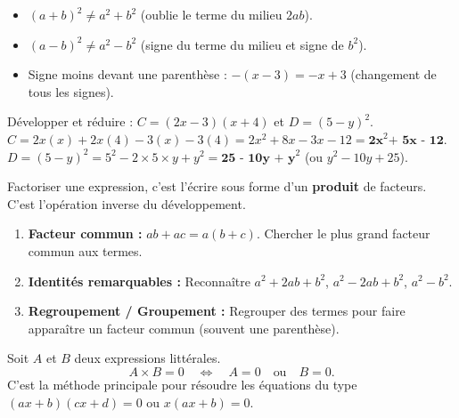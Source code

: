 \documentclass[11pt]{article}
\newcounter{popsec}
\newcounter{popsub}
\newcommand{\courssub}[1]{%
  \stepcounter{popsub}%
  \par\vspace{9pt}\noindent{\popxbold\fontsize{11.5}{13}\selectfont\color{popink}{\color{poporange}\thepopsec.\thepopsub}\hspace{6pt}#1}\par\nopagebreak\vspace{4pt}
}
\begin{document}
\begin{attention}
\begin{itemize}
    \item $(a + b)^2 \neq a^2 + b^2$ (oublie le terme du milieu $2ab$).
    \item $(a - b)^2 \neq a^2 - b^2$ (signe du terme du milieu et signe de $b^2$).
    \item Signe moins devant une parenthèse : $-(x - 3) = -x + 3$ (changement de tous les signes).
\end{itemize}
\end{attention}

\begin{exoresolu}
Développer et réduire : $C = (2x - 3)(x + 4)$ et $D = (5 - y)^2$.
\tcblower
$C = 2x(x) + 2x(4) - 3(x) - 3(4) = 2x^2 + 8x - 3x - 12 = \textbf{2x}^2 \textbf{+ 5x - 12}$.\\
$D = (5 - y)^2 = 5^2 - 2\times5\times y + y^2 = \textbf{25 - 10y + y}^2$ (ou $y^2 - 10y + 25$).
\end{exoresolu}

\courssub{Factorisation}

\begin{definition}[Factorisation]
Factoriser une expression, c'est l'écrire sous forme d'un \textbf{produit} de facteurs. C'est l'opération inverse du développement.
\end{definition}

\begin{methode}
\begin{enumerate}
    \item \textbf{Facteur commun :} $ab + ac = a(b + c)$. Chercher le plus grand facteur commun aux termes.
    \item \textbf{Identités remarquables :} Reconnaître $a^2+2ab+b^2$, $a^2-2ab+b^2$, $a^2-b^2$.
    \item \textbf{Regroupement / Groupement :} Regrouper des termes pour faire apparaître un facteur commun (souvent une parenthèse).
\end{enumerate}
\end{methode}

\begin{propriete}
Soit $A$ et $B$ deux expressions littérales.
\[
A \times B = 0 \quad \Longleftrightarrow \quad A = 0 \quad \text{ou} \quad B = 0.
\]
C'est la méthode principale pour résoudre les équations du type $(ax+b)(cx+d)=0$ ou $x(ax+b)=0$.
\end{propriete}
\end{document}
